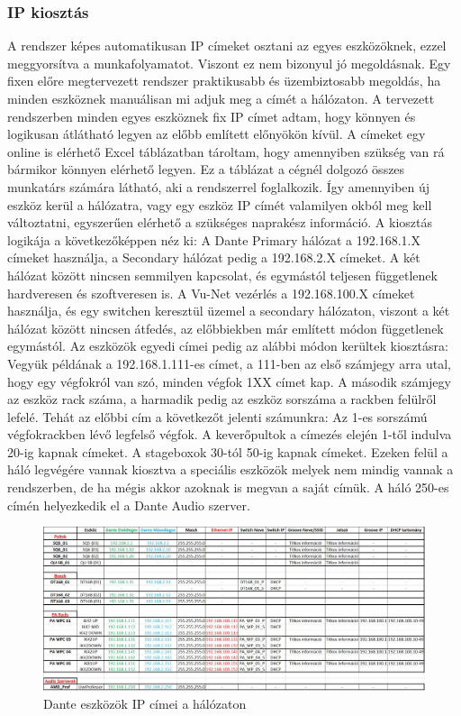 \subsubsection{IP kiosztás}
A rendszer képes automatikusan IP címeket osztani az egyes eszközöknek,
ezzel meggyorsítva a munkafolyamatot. Viszont ez nem bizonyul jó megoldásnak.
Egy fixen előre megtervezett rendszer praktikusabb és
üzembiztosabb megoldás, ha minden eszköznek manuálisan mi adjuk meg a címét a
hálózaton. A tervezett rendszerben minden egyes eszköznek fix IP címet adtam,
hogy könnyen és logikusan átlátható legyen az előbb említett előnyökön kívül.
A címeket egy online is elérhető Excel táblázatban tároltam, hogy amennyiben szükség van rá
bármikor könnyen elérhető legyen. Ez a táblázat a cégnél dolgozó összes munkatárs számára látható,
aki a rendszerrel foglalkozik. Így amennyiben új eszköz kerül a hálózatra, vagy egy eszköz IP címét
valamilyen okból meg kell változtatni, egyszerűen elérhető a szükséges naprakész információ.
A kiosztás logikája a következőképpen néz ki:
A Dante Primary hálózat a 192.168.1.X címeket használja, a Secondary hálózat
pedig a 192.168.2.X címeket. A két hálózat között nincsen semmilyen kapcsolat, és egymástól teljesen függetlenek hardveresen és szoftveresen is.
A Vu-Net vezérlés a 192.168.100.X címeket használja, és egy switchen keresztül üzemel a secondary hálózaton, viszont a két hálózat között nincsen
átfedés, az előbbiekben már említett módon függetlenek egymástól.
Az eszközök egyedi címei pedig az alábbi módon kerültek kiosztásra:
Vegyük példának a 192.168.1.111-es címet, a 111-ben az első számjegy arra utal, hogy egy végfokról van szó, minden végfok
1XX címet kap. A második számjegy az eszköz rack száma, a harmadik pedig az eszköz sorszáma a rackben felülről lefelé.
Tehát az előbbi cím a következőt jelenti számunkra: Az 1-es sorszámú végfokrackben lévő legfelső végfok.
A keverőpultok a címezés elején 1-től indulva 20-ig kapnak címeket. A stageboxok 30-tól 50-ig kapnak címeket.
Ezeken felül a háló legvégére vannak kiosztva a speciális eszközök melyek nem mindig vannak a rendszerben, de ha mégis
akkor azoknak is megvan a saját címük.
A háló 250-es címén helyezkedik el a Dante Audio szerver.
\begin{figure}[H]
	\centering
	\includegraphics[width=\textwidth, keepaspectratio]{figures/dante_ips.jpg}
	\caption{Dante eszközök IP címei a hálózaton}\label{fig:dante_ips}
\end{figure}
